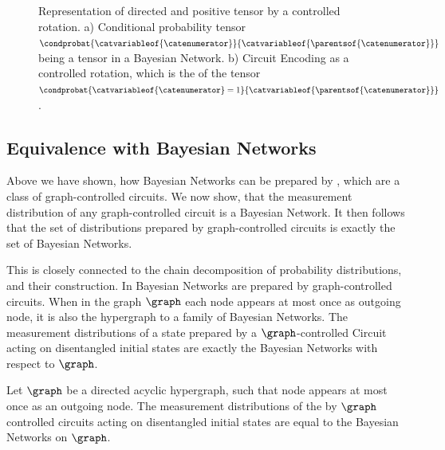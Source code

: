 
\begin{figure}
    \begin{center}
        
    \end{center}
    \caption{
        Representation of directed and positive tensor by a controlled rotation.
        a) Conditional probability tensor $\condprobat{\catvariableof{\catenumerator}}{\catvariableof{\parentsof{\catenumerator}}}$ being a tensor in a Bayesian Network.
        b) Circuit Encoding as a controlled rotation, which is the \ActivationCircuit{} of the tensor $\condprobat{\catvariableof{\catenumerator}=1}{\catvariableof{\parentsof{\catenumerator}}}$.
    }\label{fig:cpdEncoding}
\end{figure}



\subsection{Equivalence with Bayesian Networks}

Above we have shown, how Bayesian Networks can be prepared by \activationCircuits{}, which are a class of graph-controlled circuits.
We now show, that the measurement distribution of any graph-controlled circuit is a Bayesian Network.
It then follows that the set of distributions prepared by graph-controlled circuits is exactly the set of Bayesian Networks.


This is closely connected to the chain decomposition of probability distributions, and their construction.
In \cite{low_quantum_2014} Bayesian Networks are prepared by graph-controlled circuits.
When in the graph $\graph$ each node appears at most once as outgoing node, it is also the hypergraph to a family of Bayesian Networks.
The measurement distributions of a state prepared by a $\graph$-controlled Circuit acting on disentangled initial states are exactly the Bayesian Networks with respect to $\graph$.

\begin{theorem}
    \label{the:graphControlledPreparesBN}
    Let $\graph$ be a directed acyclic hypergraph, such that node appears at most once as an outgoing node.
    The measurement distributions of the by $\graph$ controlled circuits acting on disentangled initial states are equal to the Bayesian Networks on $\graph$.
\end{theorem}

